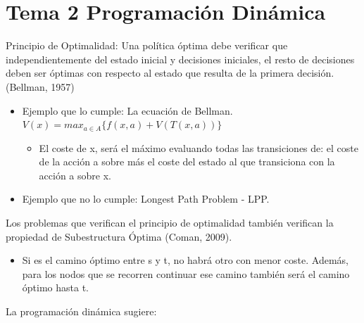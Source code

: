 \documentclass[12pt, twoside, openright]{report} %
\begin{document}
\chapter{Tema 2 Programación Dinámica}

 
    Principio de Optimalidad: Una política óptima debe verificar que
    independientemente del estado inicial y decisiones iniciales, el
    resto de decisiones deben ser óptimas con respecto al estado que
    resulta de la primera decisión. (Bellman, 1957)

    \begin{itemize}
    \item
      Ejemplo que lo cumple: La ecuación de Bellman.
      \(V(x)= max_{a \in A} \{ f(x,a)+V(T(x,a))\}\)

      \begin{itemize}
    
      \item
        El coste de x, será el máximo evaluando todas las transiciones
        de: el coste de la acción a sobre más el coste del estado al que
        transiciona con la acción a sobre x.
      \end{itemize}
    \item
      Ejemplo que no lo cumple: Longest Path Problem - LPP.
    \end{itemize}

	Los problemas que verifican el principio de optimalidad también
    verifican la propiedad de Subestructura Óptima (Coman, 2009).

    \begin{itemize}
  
    \item
      Si es el camino óptimo entre s y t, no habrá otro con menor coste.
      Además, para los nodos que se recorren continuar ese camino
      también será el camino óptimo hasta t.
    \end{itemize}

	La programación dinámica sugiere:
\end{document}
